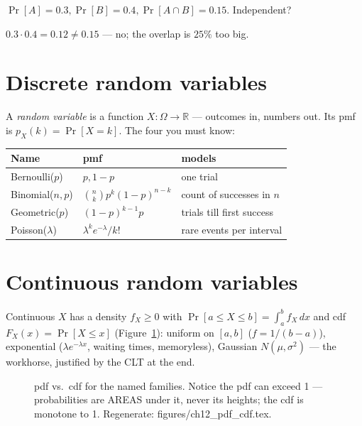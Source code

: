 \begin{exercise}[easy]
$\Pr[A]=0.3,\Pr[B]=0.4,\Pr[A\cap B]=0.15$. Independent?
\begin{solution}
$0.3\cdot0.4=0.12\ne0.15$ --- no; the overlap is $25\%$ too big.
\end{solution}
\end{exercise}

\section{Discrete random variables}\label{sec:prob-discrete}

A \emph{random variable} is a function
$X:\Omega\to\mathbb R$ --- outcomes in, numbers out. Its pmf is
$p_X(k)=\Pr[X=k]$. The four you must know:

\begin{center}
\begin{tabularx}{\textwidth}{ll>{\raggedright\arraybackslash}X}
\toprule
\textbf{Name} & \textbf{pmf} & \textbf{models}\\
\midrule
Bernoulli($p$) & $p,1-p$ & one trial \\
Binomial($n,p$) & $\binom nk p^{k}(1-p)^{n-k}$ & count of successes in $n$
\\
Geometric($p$) & $(1-p)^{k-1}p$ & trials till first success \\
Poisson($\lambda$) & $\lambda^{k}e^{-\lambda}/k!$ & rare events per
interval \\
\bottomrule
\end{tabularx}
\end{center}

\section{Continuous random variables}\label{sec:prob-continuous}

Continuous $X$ has a density $f_X\ge0$ with
$\Pr[a\le X\le b]=\int_a^b f_X\,dx$ and cdf $F_X(x)=\Pr[X\le x]$
(Figure~\ref{fig:pdfcdf}): uniform on $[a,b]$ ($f=1/(b-a)$), exponential
($\lambda e^{-\lambda x}$, waiting times, memoryless), Gaussian
$N(\mu,\sigma^{2})$ --- the workhorse, justified by the CLT at the end.

\begin{figure}[htbp]
\centering

\caption{pdf vs.\ cdf for the named families. Notice the pdf can exceed
1 --- probabilities are AREAS under it, never its heights; the cdf is
monotone to 1. Regenerate: \ttfamily figures/ch12\_pdf\_cdf.tex.}
\label{fig:pdfcdf}
\end{figure}

